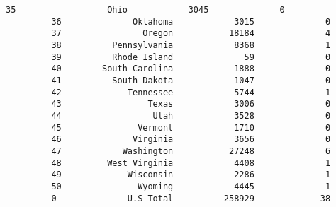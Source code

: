 \documentclass[11pt]{article}
\begin{document}
\begin{Verbatim}[commandchars=\\\{\}]
         35                  Ohio            3045              0   
         36              Oklahoma            3015              0   
         37                Oregon           18184              4   
         38          Pennsylvania            8368              1   
         39          Rhode Island              59              0   
         40        South Carolina            1888              0   
         41          South Dakota            1047              0   
         42             Tennessee            5744              1   
         43                 Texas            3006              0   
         44                  Utah            3528              0   
         45               Vermont            1710              0   
         46              Virginia            3656              0   
         47            Washington           27248              6   
         48         West Virginia            4408              1   
         49             Wisconsin            2286              1   
         50               Wyoming            4445              1   
         0              U.S Total          258929             38   
         

\end{Verbatim}
\end{document}
